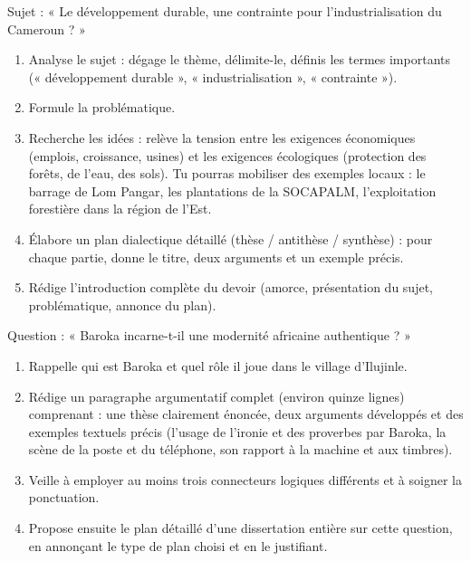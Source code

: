 \documentclass[11pt]{article}
\newcounter{popsec}
\newcounter{popsub}
\newcommand{\courssub}[1]{%
  \stepcounter{popsub}%
  \par\vspace{9pt}\noindent{\popxbold\fontsize{11.5}{13}\selectfont\color{popink}{\color{poporange}\thepopsec.\thepopsub}\hspace{6pt}#1}\par\nopagebreak\vspace{4pt}
}
\begin{document}
\courssub{Je me prépare au Bac}

\begin{exercice}
Sujet : « Le développement durable, une contrainte pour l'industrialisation du Cameroun ? »
\begin{enumerate}
\item Analyse le sujet : dégage le thème, délimite-le, définis les termes importants (« développement durable », « industrialisation », « contrainte »).
\item Formule la problématique.
\item Recherche les idées : relève la tension entre les exigences économiques (emplois, croissance, usines) et les exigences écologiques (protection des forêts, de l'eau, des sols). Tu pourras mobiliser des exemples locaux : le barrage de Lom Pangar, les plantations de la SOCAPALM, l'exploitation forestière dans la région de l'Est.
\item Élabore un plan dialectique détaillé (thèse / antithèse / synthèse) : pour chaque partie, donne le titre, deux arguments et un exemple précis.
\item Rédige l'introduction complète du devoir (amorce, présentation du sujet, problématique, annonce du plan).
\end{enumerate}
\end{exercice}

\begin{exercice}
Question : « Baroka incarne-t-il une modernité africaine authentique ? »
\begin{enumerate}
\item Rappelle qui est Baroka et quel rôle il joue dans le village d'Ilujinle.
\item Rédige un paragraphe argumentatif complet (environ quinze lignes) comprenant : une thèse clairement énoncée, deux arguments développés et des exemples textuels précis (l'usage de l'ironie et des proverbes par Baroka, la scène de la poste et du téléphone, son rapport à la machine et aux timbres).
\item Veille à employer au moins trois connecteurs logiques différents et à soigner la ponctuation.
\item Propose ensuite le plan détaillé d'une dissertation entière sur cette question, en annonçant le type de plan choisi et en le justifiant.
\end{enumerate}
\end{exercice}
\end{document}
